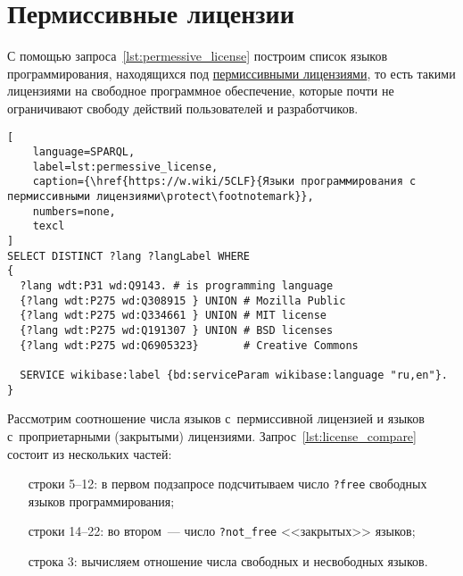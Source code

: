 \section{Пермиссивные лицензии}
%
С помощью запроса~\ref{lst:permessive_license} 
построим список языков программирования, 
находящихся под \href{https://en.wikipedia.org/wiki/Permissive_software_license}{пермиссивными лицензиями}, 
то есть такими лицензиями на свободное программное обеспечение, 
которые почти не ограничивают свободу действий пользователей и разработчиков. 
%

\begin{lstlisting}[
	language=SPARQL,
	label=lst:permessive_license,
    caption={\href{https://w.wiki/5CLF}{Языки программирования с пермиссивными лицензиями\protect\footnotemark}},
    numbers=none,
	texcl
]
SELECT DISTINCT ?lang ?langLabel WHERE
{
  ?lang wdt:P31 wd:Q9143. # is programming language
  {?lang wdt:P275 wd:Q308915 } UNION # Mozilla Public
  {?lang wdt:P275 wd:Q334661 } UNION # MIT license
  {?lang wdt:P275 wd:Q191307 } UNION # BSD licenses
  {?lang wdt:P275 wd:Q6905323}       # Creative Commons

  SERVICE wikibase:label {bd:serviceParam wikibase:language "ru,en"}.
}
\end{lstlisting}



Рассмотрим соотношение числа языков с~пермиссивной лицензией 
и языков с~проприетарными (закрытыми) лицензиями.
Запрос~\ref{lst:license_compare} состоит из нескольких частей: 
\begin{enumerate}[%
                  font=\sffamily\bfseries, 
                  leftmargin=8em,
                 ]
    \item[строки 5--12:] в первом подзапросе подсчитываем число \texttt{?free} свободных языков программирования;
    \item[строки 14--22:] во втором~--- число \texttt{?not\_free} <<закрытых>> языков;
    \item[строка 3:] вычисляем отношение числа свободных и несвободных языков.
\end{enumerate}


